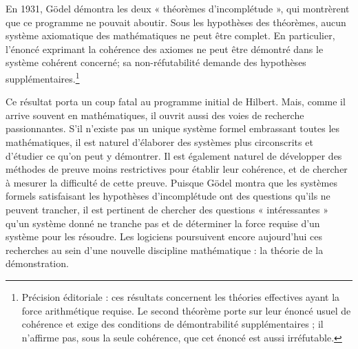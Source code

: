 \documentclass[../../../include/open-logic-section]{subfiles}
\begin{document}
En 1931, G\"odel démontra les deux « théorèmes d'incomplétude »,
qui montrèrent que ce programme ne pouvait aboutir. Sous les
hypothèses des théorèmes, aucun système axiomatique des mathématiques
ne peut être complet. En particulier, l'énoncé exprimant la
cohérence des axiomes ne peut être démontré dans le système
cohérent concerné; sa non-réfutabilité demande des hypothèses
supplémentaires.\footnote{Précision éditoriale : ces résultats concernent les théories effectives ayant la force arithmétique requise. Le second théorème porte sur leur énoncé usuel de cohérence et exige des conditions de démontrabilité supplémentaires ; il n'affirme pas, sous la seule cohérence, que cet énoncé est aussi irréfutable.}

Ce résultat porta un coup fatal au programme initial de Hilbert.
Mais, comme il arrive souvent en mathématiques, il ouvrit aussi
des voies de recherche passionnantes. S'il n'existe pas un unique
système formel embrassant toutes les mathématiques, il est naturel
d'élaborer des systèmes plus circonscrits et d'étudier ce qu'on
peut y démontrer. Il est également naturel de développer des
méthodes de preuve moins restrictives pour établir leur cohérence,
et de chercher à mesurer la difficulté de cette preuve. Puisque
G\"odel montra que les systèmes formels satisfaisant les hypothèses
d'incomplétude ont des questions qu'ils ne peuvent trancher, il est pertinent de chercher
des questions « intéressantes » qu'un système donné ne tranche pas
et de déterminer la force requise d'un système pour les résoudre.
Les logiciens poursuivent encore aujourd'hui ces recherches au
sein d'une nouvelle discipline mathématique : la théorie de la
démonstration.
\end{document}
